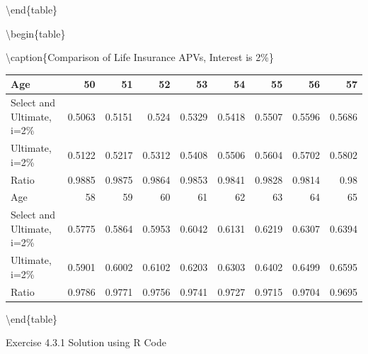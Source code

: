 \documentclass[
]{book}
\begin{document}
\textbackslash end\{table\}

\textbackslash begin\{table\}

\textbackslash caption\{\label{tab:unnamed-chunk-6}Comparison of Life Insurance APVs, Interest is 2\%\}
\centering

\begin{tabular}[t]{l|r|r|r|r|r|r|r|r}
\hline
Age & 50 & 51 & 52 & 53 & 54 & 55 & 56 & 57\\
\hline
Select and Ultimate, i=2\% & 0.5063 & 0.5151 & 0.524 & 0.5329 & 0.5418 & 0.5507 & 0.5596 & 0.5686\\
\hline
Ultimate, i=2\% & 0.5122 & 0.5217 & 0.5312 & 0.5408 & 0.5506 & 0.5604 & 0.5702 & 0.5802\\
\hline
Ratio & 0.9885 & 0.9875 & 0.9864 & 0.9853 & 0.9841 & 0.9828 & 0.9814 & 0.98\\
\hline
Age & 58 & 59 & 60 & 61 & 62 & 63 & 64 & 65\\
\hline
Select and Ultimate, i=2\% & 0.5775 & 0.5864 & 0.5953 & 0.6042 & 0.6131 & 0.6219 & 0.6307 & 0.6394\\
\hline
Ultimate, i=2\% & 0.5901 & 0.6002 & 0.6102 & 0.6203 & 0.6303 & 0.6402 & 0.6499 & 0.6595\\
\hline
Ratio & 0.9786 & 0.9771 & 0.9756 & 0.9741 & 0.9727 & 0.9715 & 0.9704 & 0.9695\\
\hline
\end{tabular}

\textbackslash end\{table\}

Exercise 4.3.1 Solution using R Code
\end{document}

